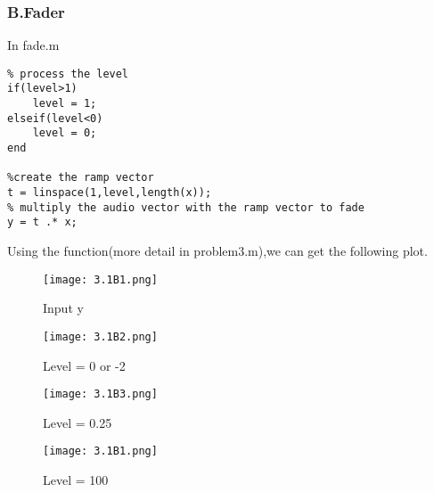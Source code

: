 \documentclass{article}
\begin{document}
\subsubsection*{B.Fader}
In fade.m
\begin{lstlisting}
% process the level
if(level>1)
    level = 1;
elseif(level<0)
    level = 0;
end

%create the ramp vector
t = linspace(1,level,length(x));
% multiply the audio vector with the ramp vector to fade
y = t .* x;
\end{lstlisting}
Using the function(more detail in problem3.m),we can get the following plot.
\begin{figure}[h]
    \begin{minipage}{0.45\textwidth}
        \centering
        \texttt{[image: 3.1B1.png]}
        \caption{Input y}
    \end{minipage}
    \begin{minipage}{0.45\textwidth}
        \centering
        \texttt{[image: 3.1B2.png]}
        \caption{Level = 0 or -2}
    \end{minipage}
    \quad

    \begin{minipage}{0.45\textwidth}
        \centering
        \texttt{[image: 3.1B3.png]}
        \caption{Level = 0.25}
    \end{minipage}
    \begin{minipage}{0.45\textwidth}
        \centering
        \texttt{[image: 3.1B1.png]}
        \caption{Level = 100}
    \end{minipage}
\end{figure}
\end{document}

